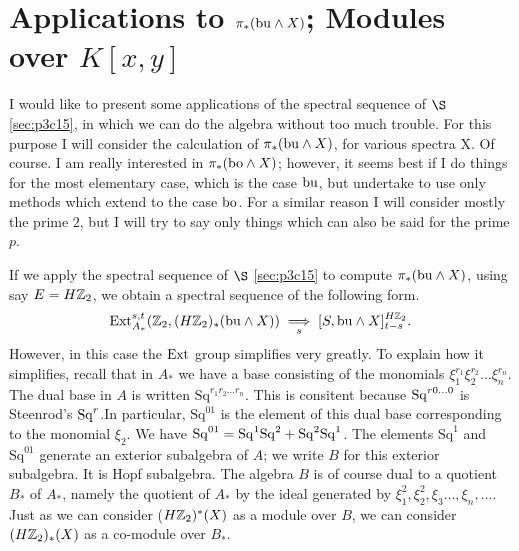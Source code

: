 \documentclass[../main]{subfiles}
\begin{document}


\chapter{Applications to \texorpdfstring{$\pi_{\ast}(\mathrm{bu} \wedge X)$}{pi(bu wedge X)}; Modules over \texorpdfstring{$K[x, y]$}{K[x,y]}}
 
\label{sec:p3c16}
 I would like to present some applications of the spectral sequence of $\S$ \ref{sec:p3c15}, in which we can do the algebra without too much trouble. For this purpose I will consider the calculation of $\pi_{\ast}(\mathrm{bu} \wedge X)$, for various spectra X. Of course. I am really interested in $\pi_{\ast}(\mathrm{bo} \wedge X)$; however, it seems best if I do things for the most elementary case, which is the case $\mathrm{bu}$, but undertake to use only methods which extend to the case $\mathrm{bo}$. For a similar reason I will consider mostly the prime $2$, but I will try to say only things which can also be said for the prime $p$.

If we apply the spectral sequence of $\S$ \ref{sec:p3c15} to compute $\pi_{\ast}(\mathrm{bu} \wedge X)$, using say $E=H\mathbb{Z}_2$, we obtain a spectral sequence of the following form. \begin{equation*}
    \mathrm{Ext}_{A_\ast}^{s, t} (\mathbb{Z}_2, (H\mathbb{Z}_2)_{\ast}(\mathrm{bu} \wedge X)) \underset{s}{\implies} [S, \mathrm{bu} \wedge X ]_{t-s}^{H\mathbb{Z}_2}.
\end{equation*}
However, in this case the $\mathrm{Ext}$ group simplifies very greatly. To explain how it simplifies, recall that in $A_{\ast}$ we have a base consisting of the monomials $\xi_{1}^{r_{1}}\xi_{2}^{r_{2}}\dots \xi_{n}^{r_{n}}$. The dual base in $A$ is written 
$\mathrm{Sq}^{r_{1}r_{2}\dots r_{n}}$. This is consitent because $\mathrm{Sq}^{r0\dots 0}$ is Steenrod's $\mathrm{Sq}^r$.In particular, $\mathrm{Sq}^{01}$ is the element of this dual base corresponding to the monomial $\xi_{2}$. We have $\mathrm{Sq}^{01}=\mathrm{Sq}^{1}\mathrm{Sq}^{2}+\mathrm{Sq}^{2}\mathrm{Sq}^{1}$. The elements $\mathrm{Sq}^{1}$ and $\mathrm{Sq}^{01}$ generate an exterior subalgebra of $A$; we write $B$ for this exterior subalgebra. It is Hopf subalgebra. The algebra $B$ is of course dual to a quotient $B_{\ast}$ of $A_{\ast}$, namely the quotient of $A_{\ast}$ by the ideal generated by $\xi_{1}^2, \xi_{2}^2, \xi_{3}\dots, \xi_{n}, \dots $. Just as we can consider ($H\mathbb{Z}_2)^{\ast}(X)$ as a module over $B$, we can consider $(H\mathbb{Z}_2)_{\ast}(X)$ as a
co-module over $B_{\ast}$.
\end{document}
